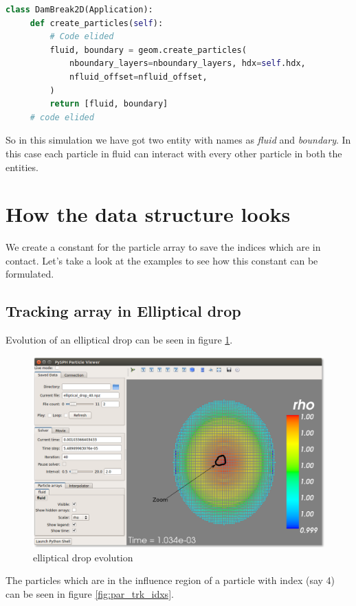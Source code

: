\begin{lstlisting}[language=Python]
 class DamBreak2D(Application):
     def create_particles(self):
         # Code elided
         fluid, boundary = geom.create_particles(
             nboundary_layers=nboundary_layers, hdx=self.hdx,
             nfluid_offset=nfluid_offset,
         )
         return [fluid, boundary]
     # code elided
\end{lstlisting}

So in this simulation we have got two entity with names as \emph{fluid} and
\emph{boundary}. In this case each particle in fluid can interact with every other
particle in both the entities.


\section{How the data structure looks}
\label{sec-3}
We create a constant for the particle array to save the indices which are in
contact. Let's take a look at the examples to see how this constant can be
formulated.

\subsection{Tracking array in Elliptical drop}
\label{sec-3-1}
Evolution of an elliptical drop can be seen in figure \ref{fig:el_d}.
\begin{figure}[H]
\centering
\includegraphics[scale=0.35]{figures/elliptical_drop.png}
\caption{elliptical drop evolution\label{fig:el_d}}
\end{figure}

The particles which are in the influence region of a particle with index
(say 4) can be seen in figure \ref{fig:par_trk_idxs}.

